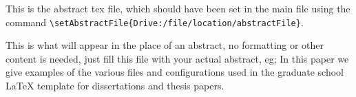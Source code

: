 This is the abstract tex file, which should have been set in the main file using the command \verb|\setAbstractFile{Drive:/file/location/abstractFile}|.

This is what will appear in the place of an abstract, no formatting or other content is needed, just fill this file with your actual abstract, eg; In this paper we give examples of the various files and configurations used in the graduate school \LaTeX{} template for dissertations and thesis papers.